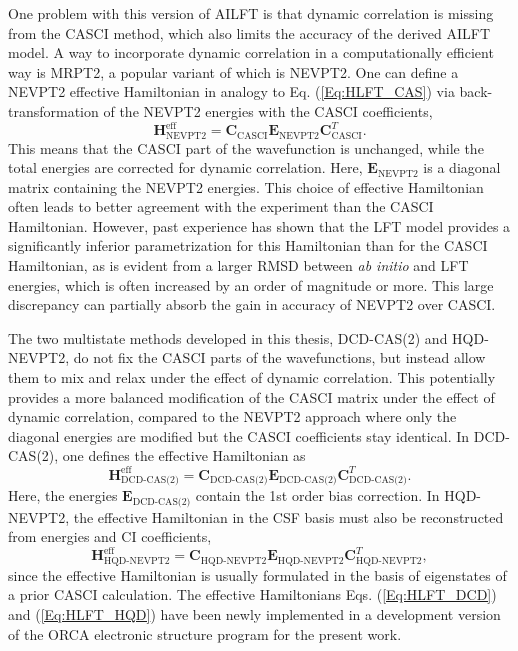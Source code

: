 One problem with this version of AILFT is that dynamic correlation is missing from the CASCI method, which also limits the accuracy of the derived AILFT model. A way to incorporate dynamic correlation in a computationally efficient way is MRPT2, a popular variant of which is NEVPT2. One can define a NEVPT2 effective Hamiltonian in analogy to Eq. (\ref{Eq:HLFT_CAS}) via back-transformation of the NEVPT2 energies with the CASCI coefficients,
	\begin{equation}
	\label{Eq:HLFT_NEV}
	{\mathbf{H}}_{{\text{NEVPT2}}}^{{\text{eff}}} = {{\mathbf{C}}_{{\text{CASCI}}}}{{\mathbf{E}}_{{\text{NEVPT2}}}}{\mathbf{C}}_{{\text{CASCI}}}^T.
	\end{equation}
This means that the CASCI part of the wavefunction is unchanged, while the total energies are corrected for dynamic correlation.
Here, ${{\mathbf{E}}_{{\text{NEVPT2}}}}$ is a diagonal matrix containing the NEVPT2 energies. This choice of effective Hamiltonian often leads to better agreement with the experiment than the CASCI Hamiltonian. However, past experience has shown that the LFT model provides a significantly inferior parametrization for this Hamiltonian than for the CASCI Hamiltonian, as is evident from a larger RMSD between \textit{ab initio} and LFT energies, which is often increased by an order of magnitude or more.\cite{SinghEAN_2017_2} This large discrepancy can partially absorb the gain in accuracy of NEVPT2 over CASCI.

The two multistate methods developed in this thesis, DCD-CAS(2) and HQD-NEVPT2, do not fix the CASCI parts of the wavefunctions, but instead allow them to mix and relax under the effect of dynamic correlation. This potentially provides a more balanced modification of the CASCI matrix under the effect of dynamic correlation, compared to the NEVPT2 approach where only the diagonal energies are modified but the CASCI coefficients stay identical.
In DCD-CAS(2), one defines the effective Hamiltonian as
	\begin{equation}
	\label{Eq:HLFT_DCD}
	{\mathbf{H}}_{{\text{DCD-CAS(2)}}}^{{\text{eff}}} = {{\mathbf{C}}_{{\text{DCD-CAS(2)}}}}{{\mathbf{E}}_{{\text{DCD-CAS(2)}}}}{\mathbf{C}}_{{\text{DCD-CAS(2)}}}^T.
	\end{equation}
Here, the energies ${\mathbf{E}}_{{\text{DCD-CAS(2)}}}$ contain the 1st order bias correction.
In HQD-NEVPT2, the effective Hamiltonian in the CSF basis must also be reconstructed from energies and CI coefficients,
	\begin{equation}
	\label{Eq:HLFT_HQD}
	{\mathbf{H}}_{{\text{HQD-NEVPT2}}}^{{\text{eff}}} = {{\mathbf{C}}_{{\text{HQD-NEVPT2}}}}{{\mathbf{E}}_{{\text{HQD-NEVPT2}}}}{\mathbf{C}}_{{\text{HQD-NEVPT2}}}^T,
	\end{equation}
since the effective Hamiltonian is usually formulated in the basis of eigenstates of a prior CASCI calculation. The effective Hamiltonians Eqs. (\ref{Eq:HLFT_DCD}) and (\ref{Eq:HLFT_HQD}) have been newly implemented in a development version of the ORCA electronic structure program\cite{Neese_2018_1327} for the present work.

